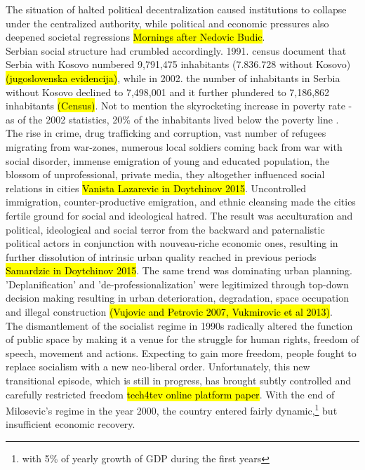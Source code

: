 \documentclass[11pt]{report}
\begin{document}
The situation of halted political decentralization caused institutions to collapse under the centralized authority, while political and economic pressures also deepened societal regressions \hl{Mornings after Nedovic Budic}. 
\\
Serbian social structure had crumbled accordingly. 1991. census document that Serbia with Kosovo numbered 9,791,475 inhabitants (7.836.728 without Kosovo) \hl{(jugoslovenska evidencija)}, while in 2002. the number of inhabitants in Serbia without Kosovo declined to 7,498,001 and it further plundered to 7,186,862 inhabitants \hl{(Census)}.
Not to mention the skyrocketing increase in poverty rate - as of the 2002 statistics, 20\% of the inhabitants lived below the poverty line \cite{Vladina strategija za smanjenje siromastva}.
\\
The rise in crime, drug trafficking and corruption, vast number of refugees migrating from war-zones, numerous local soldiers coming back from war with social disorder, immense emigration of young and educated population, the blossom of unprofessional, private media, they altogether influenced social relations in cities \hl{Vanista Lazarevic in Doytchinov 2015}.
Uncontrolled immigration, counter-productive emigration,  and ethnic cleansing made the cities fertile ground for social and ideological hatred.
The result was acculturation and political, ideological and social terror from the backward and paternalistic political actors in conjunction with nouveau-riche economic ones, resulting in further dissolution of intrinsic urban quality reached in previous periods \hl{Samardzic in Doytchinov 2015}.
The same trend was dominating urban planning. 'Deplanification' and 'de-professionalization' were legitimized through top-down decision making resulting in urban deterioration, degradation, space occupation and illegal construction \hl{(Vujovic and Petrovic 2007, Vukmirovic et al 2013)}.
\\
The dismantlement of the socialist regime in 1990s radically altered the function of public space by making it a venue for the struggle for human rights, freedom of speech, movement and actions.
Expecting to gain more freedom, people fought to replace socialism with a new neo-liberal order.
Unfortunately, this new transitional episode, which is still in progress, has brought subtly controlled and carefully restricted freedom \hl{tech4tev online platform paper}.
With the end of Milosevic's regime in the year 2000, the country entered fairly dynamic,\footnote{with 5\% of yearly growth of GDP during the first years} but insufficient economic recovery.
\end{document}
